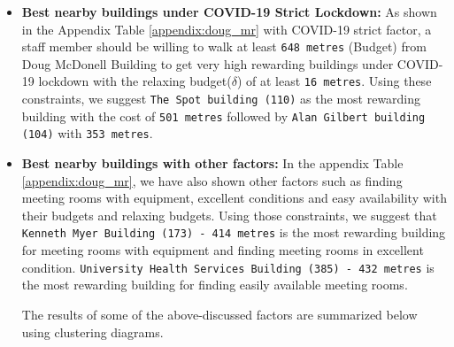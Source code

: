 \begin{itemize}
\item \textbf{Best nearby buildings under COVID-19 Strict Lockdown:} As shown in the Appendix Table \ref{appendix:doug_mr} with COVID-19 strict factor, a staff member should be willing to walk at least \texttt{648 metres} (Budget) from Doug McDonell Building to get very high rewarding buildings under COVID-19 lockdown with the relaxing budget($\delta$) of at least \texttt{16 metres}. Using these constraints, we suggest \texttt{The Spot building (110)} as the most rewarding building with the cost of \texttt{501 metres} followed by \texttt{Alan Gilbert building (104)} with \texttt{353 metres}.


\item \textbf{Best nearby buildings with other factors:} In the appendix Table \ref{appendix:doug_mr}, we have also shown other factors such as finding meeting rooms with equipment, excellent conditions and easy availability with their budgets and relaxing budgets. Using those constraints, we suggest that \texttt{Kenneth Myer Building (173) - 414 metres} is the most rewarding building for meeting rooms with equipment and finding meeting rooms in excellent condition. \texttt{University Health Services Building (385) - 432 metres} is the most rewarding building for finding easily available meeting rooms.

The results of some of the above-discussed factors are summarized below using clustering diagrams.


\end{itemize}
